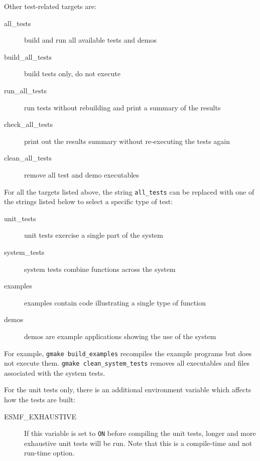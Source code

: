 \noindent Other test-related targets are:
\begin{description}
\item[all\_tests] build and run all available tests and demos
\item[build\_all\_tests] build tests only, do not execute
\item[run\_all\_tests] run tests without rebuilding and print a
summary of the results
\item[check\_all\_tests] 
print out the results summary without re-executing the tests again
\item[clean\_all\_tests] remove all test and demo executables 
\end{description}

For all the targets listed above, the string {\tt all\_tests} can be
replaced with one of the strings listed below to select a
specific type of test:
\begin{description}
\item[unit\_tests] unit tests exercise a single part of the system
\item[system\_tests] system tests combine functions across the system
\item[examples] examples contain code illustrating a single type of function
\item[demos] demos are example applications showing the use of the system
\end{description}
For example, {\tt gmake build\_examples} recompiles the example programs but 
does not execute them.  {\tt gmake clean\_system\_tests} removes all
executables and files associated with the system tests.

For the unit tests only, there is an additional environment variable
which affects how the tests are built:
\begin{description}
\item[ESMF\_EXHAUSTIVE]
If this variable is set to {\tt ON} before compiling the unit tests,
longer and more exhaustive unit tests will be run.  Note that this is a
compile-time and not run-time option.
\end{description}

